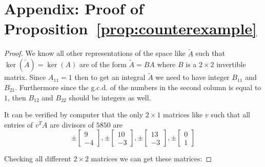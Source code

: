 \documentclass[11pt, a4paper]{article}
\newcommand{\1}{\mathbbm{1}}
\theoremstyle{case}
\begin{document}
\clearpage



\appendix
\section{Appendix: Proof of Proposition~\ref{prop:counterexample}}

\counterex*

\begin{proof}
We know all other representations of the space like $\tilde{A}$ such that $\ker(\tilde{A}) = \ker(A)$ are of the form $\tilde{A} = BA$ where $B$ is a $2 \times 2$ invertible matrix. Since $A_{11} = 1$ then to get an integral $\tilde{A}$ we need to have integer $B_{11}$ and $B_{21}$. Furthermore since the g.c.d. of the numbers in the second column is equal to $1$, then $B_{12}$ and $B_{22}$ should be integers as well.

It can be verified by computer that the only $2\times 1$ matrices like $v$ such that all entries of $v^TA$ are divisors of $5850$ are
$$\pm \begin{bmatrix}9 \\ -4 \end{bmatrix},\pm \begin{bmatrix}10 \\ -3 \end{bmatrix},\pm \begin{bmatrix}13 \\-3\end{bmatrix},\pm \begin{bmatrix}0 \\1\end{bmatrix}$$

Checking all different $2 \times 2$ matrices we can get these matrices:


\end{proof}
\end{document}
